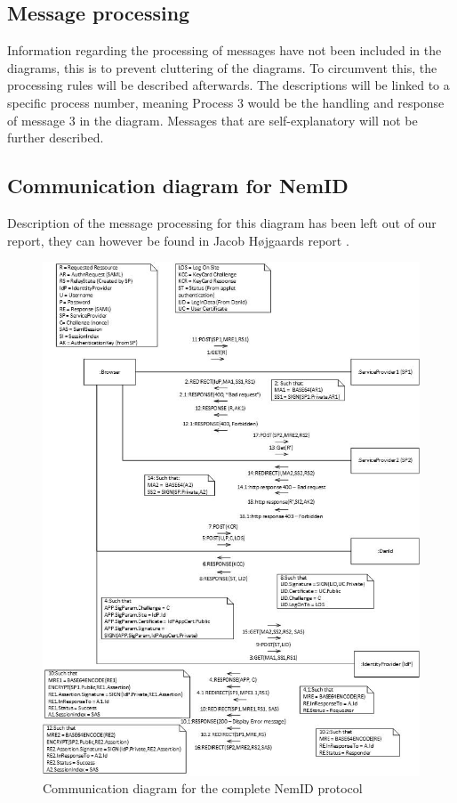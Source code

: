 \documentclass[twosided]{report}
\begin{document}
\subsection{Message processing}
Information regarding the processing of messages have not been included in the diagrams, this is to prevent cluttering of the diagrams. To circumvent this, the processing rules will be described afterwards. The descriptions will be linked to a specific process number, meaning Process 3 would be the handling and response of message 3 in the diagram. Messages that are self-explanatory will not be further described.

\subsection{Communication diagram for NemID}
Description of the message processing for this diagram has been left out of our report, they can however be found in Jacob H{\o}jgaards report \cite{jacob}.

\begin{figure}[H]
	\centering
	\includegraphics{images/Communication-Jacob.jpg}
	\caption[Communication diagram for the complete NemID protocol]{Communication diagram for the complete NemID protocol \cite{jacob}}
	\label{fig:jacobCommunication}
\end{figure}
\end{document}

